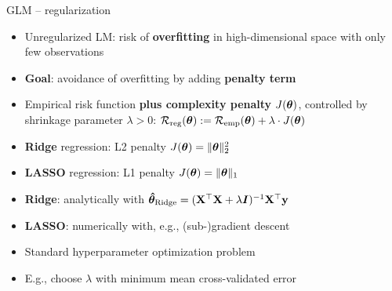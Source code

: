 \begin{frame2}{GLM -- regularization}


\begin{itemize}
  \item Unregularized LM: risk of \textbf{overfitting} in high-dimensional 
  space with only few observations
  \item \textbf{Goal}: avoidance of overfitting by adding \textbf{penalty term}
\end{itemize}





        

\begin{itemize}
  \item Empirical risk function \textbf{plus complexity penalty} 
  $J(\bm{\theta})$, controlled by shrinkage parameter $\lambda > 0$:
  $\mathcal{R}_{\text{reg}}(\bm{\theta}) := \mathcal{R}_{\text{emp}}(\bm{\theta}) + \lambda \cdot J(\bm{\theta})$
    \item \textbf{Ridge} regression: L2 penalty $J(\bm{\theta}) = \|\bm{\theta}\|_2^2 $
    \item \textbf{LASSO} regression: L1 penalty $J(\bm{\theta}) = \|\bm{\theta}\|_1 $

\end{itemize}

\begin{itemize}
  \item \textbf{Ridge}: analytically with 
  $\bm{\hat\theta}_{\text{Ridge}} = (\mathbf{X}^\top \mathbf{X}  + \lambda \bm{I})^{-1} \mathbf{X}^\top 
  \mathbf{y}$
  \item \textbf{LASSO}: numerically with, e.g., (sub-)gradient descent
\end{itemize}


\begin{itemize}
  \item Standard hyperparameter optimization problem
  \item E.g., choose $\lambda$ with minimum mean cross-validated error 
\end{itemize}
\end{frame2}

